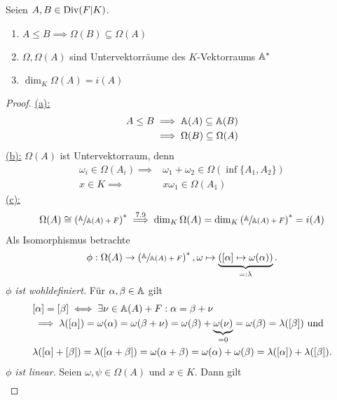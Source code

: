 \begin{lemma}
    Seien $A,B \in \operatorname{Div}(F|K)$.
    \begin{enumerate}[label=(\alph*)]
        \item $A \leq B \implies \Omega(B) \subseteq \Omega(A)$
        \item $\Omega,\Omega(A)$ sind Untervektorräume des $K$-Vektorraums $\mathbb{A}^\ast$
        \item $\dim_K\Omega(A) = i(A)$
    \end{enumerate}
\end{lemma}
\begin{proof}
    \underline{(a):} 
    \begin{align*}
        A \leq B & \implies \mathbb{A}(A) \subseteq \mathbb{A}(B)\\
            & \implies \Omega(B) \subseteq \Omega(A)
    \end{align*}
    \underline{(b):} $\Omega(A)$ ist Untervektorraum, denn
    \begin{align*}
        \omega_i \in \Omega(A_i) \implies & \omega_1 + \omega_2 \in \Omega(\inf\{A_1,A_2\})\\
        x \in K \implies & x\omega_1 \in \Omega(A_1)
    \end{align*}
    \underline{(c):}
    \begin{align*}
        \Omega(A) \cong \left(\sfrac{\mathbb{A}}{\mathbb{A}(A) + F}\right)^\ast \stackrel{7.9}{\implies} \dim_K \Omega(A)
        = \dim_K\left(\sfrac{\mathbb{A}}{\mathbb{A}(A)+F}\right)^\ast = i(A)
    \end{align*}
    Als Isomorphismus betrachte 
    $$ \phi: \Omega(A) \to \left(\sfrac{\mathbb{A}}{\mathbb{A}(A) + F}\right)^*, \omega \mapsto \underbrace{\left([\alpha] \mapsto \omega(\alpha)\right)}_{=: \lambda}. $$
    \emph{$\phi$ ist wohldefiniert.} Für $\alpha, \beta \in \mathbb{A}$ gilt
    \begin{align*}
        &[\alpha] = [\beta] \iff \exists \nu \in \mathbb{A}(A) + F: \alpha = \beta + \nu\\
        & \implies \lambda([\alpha]) = \omega(\alpha) = \omega(\beta + \nu) = \omega(\beta) + \underbrace{\omega(\nu)}_{=0} = \omega(\beta) = \lambda([\beta]) \text{ und}\\
        & \lambda([\alpha] + [\beta]) = \lambda([\alpha + \beta]) = \omega(\alpha + \beta) = \omega(\alpha) + \omega(\beta) = \lambda([\alpha]) + \lambda([\beta]).
    \end{align*}
    \emph{$\phi$ ist linear.} Seien $\omega, \psi \in \Omega(A)$ und $x \in K$. Dann gilt
    \begin{align*}

\end{align*}
\end{proof}
